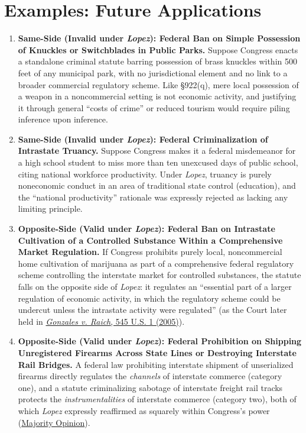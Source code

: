 \documentclass[12pt]{article}
\begin{document}
\section{Examples: Future Applications}
\begin{enumerate}
\item \textbf{Same-Side (Invalid under \textit{Lopez}): Federal Ban on Simple Possession of Knuckles or Switchblades in Public Parks.} Suppose Congress enacts a standalone criminal statute barring possession of brass knuckles within 500 feet of any municipal park, with no jurisdictional element and no link to a broader commercial regulatory scheme. Like \S 922(q), mere local possession of a weapon in a noncommercial setting is not economic activity, and justifying it through general ``costs of crime'' or reduced tourism would require piling inference upon inference.
\item \textbf{Same-Side (Invalid under \textit{Lopez}): Federal Criminalization of Intrastate Truancy.} Suppose Congress makes it a federal misdemeanor for a high school student to miss more than ten unexcused days of public school, citing national workforce productivity. Under \textit{Lopez}, truancy is purely noneconomic conduct in an area of traditional state control (education), and the ``national productivity'' rationale was expressly rejected as lacking any limiting principle.
\item \textbf{Opposite-Side (Valid under \textit{Lopez}): Federal Ban on Intrastate Cultivation of a Controlled Substance Within a Comprehensive Market Regulation.} If Congress prohibits purely local, noncommercial home cultivation of marijuana as part of a comprehensive federal regulatory scheme controlling the interstate market for controlled substances, the statute falls on the opposite side of \textit{Lopez}: it regulates an ``essential part of a larger regulation of economic activity, in which the regulatory scheme could be undercut unless the intrastate activity were regulated'' (as the Court later held in \href{https://www.law.cornell.edu/supremecourt/text/03-1454}{\textit{Gonzales v. Raich}, 545 U.S. 1 (2005)}).
\item \textbf{Opposite-Side (Valid under \textit{Lopez}): Federal Prohibition on Shipping Unregistered Firearms Across State Lines or Destroying Interstate Rail Bridges.} A federal law prohibiting interstate shipment of unserialized firearms directly regulates the \textit{channels} of interstate commerce (category one), and a statute criminalizing sabotage of interstate freight rail tracks protects the \textit{instrumentalities} of interstate commerce (category two), both of which \textit{Lopez} expressly reaffirmed as squarely within Congress's power (\href{https://www.law.cornell.edu/supct/html/93-1260.ZO.html}{Majority Opinion}).

\end{enumerate}
\end{document}
